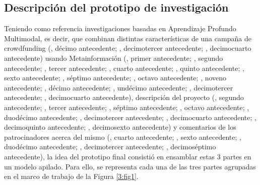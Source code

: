 \subsection{Descripción del prototipo de investigación}
Teniendo como referencia investigaciones basadas en Aprendizaje Profundo Multimodal, es decir, que combinan distintas características de una campaña de crowdfunding (\cite{pr_kamath2018suplearn}, décimo antecedente; \cite{pr_jin2019dayssuccess}, decimotercer antecedente; \cite{pr_cheng2019deeplearning}, decimocuarto antecedente) usando Metainformación (\cite{pr_chen2013kickpredict}, primer antecedente; \cite{pr_mitra2014phrases}, segundo antecedente; \cite{pr_zhou2015projectdesc}, tercer antecedente; \cite{pr_chen2015predcrowd}, cuarto antecedente; \cite{pr_beckwith2016predcrowd}, quinto antecedente; \cite{pr_li2016predcrowd}, sexto antecedente; \cite{pr_yuan2016textanalytics}, séptimo antecedente; \cite{pr_sawhney2016usingLT}, octavo antecedente; \cite{pr_kaur2017socmedcrowd}, noveno antecedente; \cite{pr_kamath2018suplearn}, décimo antecedente; \cite{pr_yu2018deeplearning}, undécimo antecedente; \cite{pr_jin2019dayssuccess}, decimotercer antecedente; \cite{pr_cheng2019deeplearning}, decimocuarto antecedente), descripción del proyecto (\cite{pr_mitra2014phrases}, segundo antecedente; \cite{pr_zhou2015projectdesc}, tercer antecedente; \cite{pr_yuan2016textanalytics}, séptimo antecedente; \cite{pr_sawhney2016usingLT}, octavo antecedente; \cite{pr_lee2018contentDL}, duodécimo antecedente; \cite{pr_jin2019dayssuccess}, decimotercer antecedente; \cite{pr_cheng2019deeplearning}, decimocuarto antecedente; \cite{pr_chen2019keywords_crowdfunding}, decimoquinto antecedente; \cite{pr_chaichi2019nlp_3dprinting}, decimosexto antecedente) y comentarios de los patrocinadores acerca del mismo (\cite{pr_chen2015predcrowd}, cuarto antecedente; \cite{pr_li2016predcrowd}, sexto antecedente; \cite{pr_lee2018contentDL}, duodécimo antecedente; \cite{pr_jin2019dayssuccess}, decimotercer antecedente; \cite{pr_shafqat2019topicpredictions}, decimoséptimo antecedente), la idea del prototipo final consistió en ensamblar estas 3 partes en un modelo apilado. Para ello, se representa cada una de las tres partes agrupadas en el marco de trabajo de la Figura \ref{3:fig1}.
